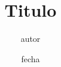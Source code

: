 \documentclass[a4paper]{article}
\title{Titulo}
\author{autor }
\date{fecha}
\begin{document}
 

	\textstyle %

	\displaystyle %
\end{document}

